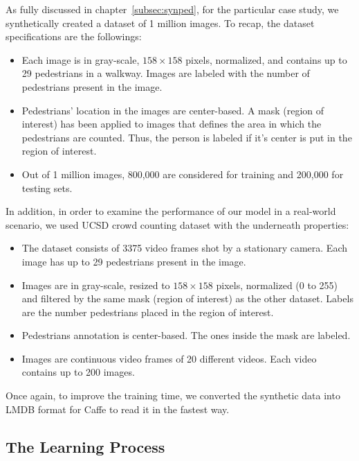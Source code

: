 As fully discussed in chapter~\ref{subsec:synped}, for the particular case study, we synthetically created a dataset of 1 million images. To recap, the dataset specifications are the followings:
\begin{itemize}
\item Each image is in gray-scale, $158\times158$ pixels, normalized, and contains up to 29 pedestrians in a walkway. Images are labeled with the number of pedestrians present in the image.  
\item Pedestrians' location in the images are center-based. A mask (region of interest) has been applied to images that defines the area in which the pedestrians are counted. Thus, the person is labeled if it's center is put in the region of interest.   
\item Out of 1 million images, 800,000 are considered for training and 200,000 for testing sets.
\end{itemize} 

\noindent In addition, in order to examine the performance of our model in a real-world scenario, we used UCSD crowd counting dataset \cite{chan2008privacy} with the underneath properties:

\begin{itemize}
\item The dataset consists of 3375 video frames shot by a stationary camera. Each image has up to 29 pedestrians present in the image.
\item Images are in gray-scale, resized to $158\times158$ pixels, normalized (0 to 255) and filtered by the same mask (region of interest) as the other dataset. Labels are the number pedestrians placed in the region of interest.
\item Pedestrians annotation is center-based. The ones inside the mask are labeled.  
\item Images are continuous video frames of 20 different videos. Each video contains up to 200 images.  
\end{itemize}

Once again, to improve the training time, we converted the synthetic data into LMDB format for Caffe to read it in the fastest way.


\subsection{The Learning Process}

